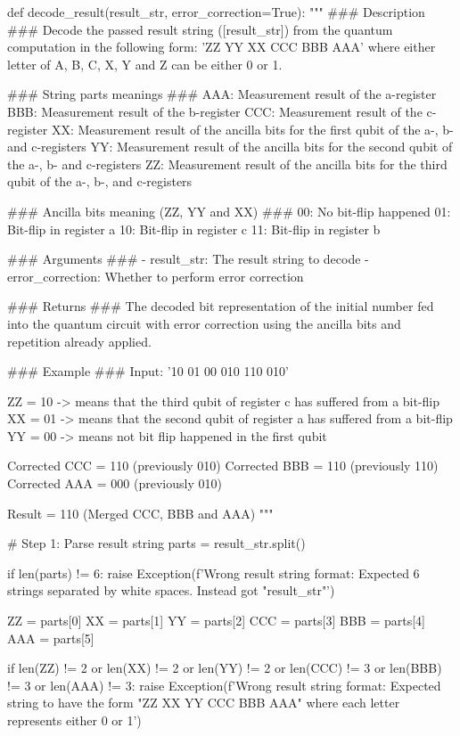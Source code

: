 \begin{python}
def decode_result(result_str, error_correction=True):
    """
    ### Description ###
    Decode the passed result string ([result_str]) from the quantum computation in the following form:
    'ZZ YY XX CCC BBB AAA' where either letter of A, B, C, X, Y and Z can be either 0 or 1.

    ### String parts meanings ###
    AAA: Measurement result of the a-register
    BBB: Measurement result of the b-register
    CCC: Measurement result of the c-register
    XX: Measurement result of the ancilla bits for the first qubit of the a-, b- and c-registers
    YY: Measurement result of the ancilla bits for the second qubit of the a-, b- and c-registers
    ZZ: Measurement result of the ancilla bits for the third qubit of the a-, b-, and c-registers

    ### Ancilla bits meaning (ZZ, YY and XX) ###
    00: No bit-flip happened
    01: Bit-flip in register a
    10: Bit-flip in register c
    11: Bit-flip in register b

    ### Arguments ###
    - result_str: The result string to decode
    - error_correction: Whether to perform error correction

    ### Returns ###
    The decoded bit representation of the initial number fed into the quantum circuit
    with error correction using the ancilla bits and repetition already applied.

    ### Example ###
    Input: '10 01 00 010 110 010'

    ZZ = 10 -> means that the third qubit of register c has suffered from a bit-flip
    XX = 01 -> means that the second qubit of register a has suffered from a bit-flip
    YY = 00 -> means not bit flip happened in the first qubit

    Corrected CCC = 110 (previously 010)
    Corrected BBB = 110 (previously 110)
    Corrected AAA = 000 (previously 010)

    Result = 110 (Merged CCC, BBB and AAA)
    """

    # Step 1: Parse result string
    parts = result_str.split()

    if len(parts) != 6:
        raise Exception(f'Wrong result string format: Expected 6 strings separated by white spaces. Instead got "{result_str}"')

    ZZ = parts[0]
    XX = parts[1]
    YY = parts[2]
    CCC = parts[3]
    BBB = parts[4]
    AAA = parts[5]

    if len(ZZ) != 2 or len(XX) != 2 or len(YY) != 2 or len(CCC) != 3 or len(BBB) != 3 or len(AAA) != 3:
        raise Exception(f'Wrong result string format: Expected string to have the form "ZZ XX YY CCC BBB AAA" where each letter represents either 0 or 1')


\end{python}
